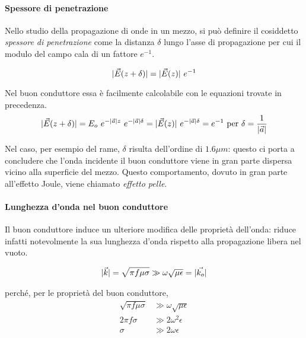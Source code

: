 		\paragraph{Spessore di penetrazione}
		Nello studio della propagazione di onde in un mezzo, si può definire il cosiddetto \emph{spessore di penetrazione} come la distanza $\delta$ lungo l'asse di propagazione per cui il modulo del campo cala di un fattore $e^{-1}$.

		\begin{equation*}
			|\vec{E}(z + \delta)| = |\vec{E}(z)| ~ e^{-1}
		\end{equation*}

		Nel buon conduttore essa è facilmente calcolabile con le equazioni trovate in precedenza.
		\begin{equation*} \begin{split}
			|\vec{E}(z + \delta)| = E_o ~ e^{-|\vec{a}| z} ~ e^{-|\vec{a}| \delta} = |\vec{E}(z)| ~ e^{-|\vec{a}| \delta} = e^{-1} \text{ per } \delta = \frac{1}{|\vec{a}|}
		\end{split} \end{equation*}

		Nel caso, per esempio del rame, $\delta$ risulta dell'ordine di $1.6 \mu m$: questo ci porta a concludere che l'onda incidente il buon conduttore viene in gran parte dispersa vicino alla superficie del mezzo.
		Questo comportamento, dovuto in gran parte all'effetto Joule, viene chiamato \emph{effetto pelle}.

		\paragraph{Lunghezza d'onda nel buon conduttore}
		Il buon conduttore induce un ulteriore modifica delle proprietà dell'onda: riduce infatti notevolmente la sua lunghezza d'onda rispetto alla propagazione libera nel vuoto.

		\begin{equation*} \begin{split}
			& |\vec{k}|
				= \sqrt{\pi f \mu \sigma}
				\gg \omega \sqrt{\mu \epsilon}
				= |\vec{k_o}| \\
		\end{split} \end{equation*}

		perché, per le proprietà del buon conduttore,
		\begin{equation*} \begin{split}
				\sqrt{\pi f \mu \sigma} &\gg \omega \sqrt{\mu \epsilon} \\
				2 \pi f \sigma &\gg 2 \omega^2 \epsilon \\
				\sigma &\gg 2 \omega \epsilon
		\end{split} \end{equation*}

